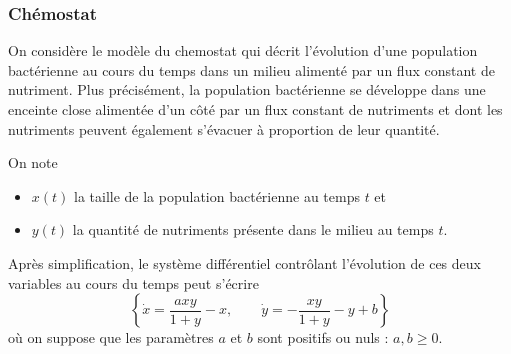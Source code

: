 \subsubsection{Chémostat}


On considère le modèle du chemostat qui décrit l'évolution d'une population bactérienne au cours du temps dans un milieu alimenté par un flux constant de nutriment. 
Plus précisément, la population bactérienne se développe dans une enceinte close alimentée d'un côté par un flux constant de nutriments et dont les nutriments peuvent également s'évacuer à proportion de leur quantité.

On note
\begin{itemize}
  \item $x(t)$ la taille de la population bactérienne au temps $t$ et
  \item $y(t)$ la quantité de nutriments présente dans le milieu au temps $t$.
\end{itemize}
Après simplification, le système différentiel contrôlant l'évolution de ces deux variables au cours du temps peut s'écrire
$$
\left\{
  \dot x = \displaystyle{\frac{a x y}{1 + y} - x}, 
  \qquad
  \dot y = \displaystyle{- \frac{x y}{1 + y} - y + b}
\right\}
$$
où on suppose que les paramètres $a$ et $b$ sont positifs ou nuls : $a, b \geq 0$.

